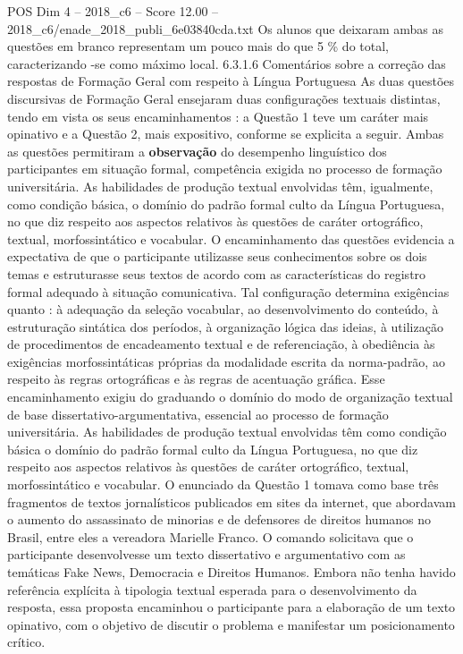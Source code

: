 \begin{textsample}{POS Dim 4 – 2018\_c6 – Score 12.00 – 2018\_c6/enade\_2018\_publi\_6e03840cda.txt}
Os alunos que deixaram ambas as questões em branco representam um pouco mais do que 5 \% do total, caracterizando -se como máximo local. 6.3.1.6 Comentários sobre a correção das respostas de Formação Geral com respeito à Língua Portuguesa As duas questões discursivas de Formação Geral ensejaram duas configurações textuais distintas, tendo em vista os seus encaminhamentos : a Questão 1 teve um caráter mais opinativo e a Questão 2, mais expositivo, conforme se explicita a seguir.
Ambas as questões permitiram a \textbf{observação} do desempenho linguístico dos participantes em situação formal, competência exigida no processo de formação universitária.
As habilidades de produção textual envolvidas têm, igualmente, como condição básica, o domínio do padrão formal culto da Língua Portuguesa, no que diz respeito aos aspectos relativos às questões de caráter ortográfico, textual, morfossintático e vocabular.
O encaminhamento das questões evidencia a expectativa de que o participante utilizasse seus conhecimentos sobre os dois temas e estruturasse seus textos de acordo com as características do registro formal adequado à situação comunicativa.
Tal configuração determina exigências quanto : à adequação da seleção vocabular, ao desenvolvimento do conteúdo, à estruturação sintática dos períodos, à organização lógica das ideias, à utilização de procedimentos de encadeamento textual e de referenciação, à obediência às exigências morfossintáticas próprias da modalidade escrita da norma-padrão, ao respeito às regras ortográficas e às regras de acentuação gráfica.
Esse encaminhamento exigiu do graduando o domínio do modo de organização textual de base dissertativo-argumentativa, essencial ao processo de formação universitária.
As habilidades de produção textual envolvidas têm como condição básica o domínio do padrão formal culto da Língua Portuguesa, no que diz respeito aos aspectos relativos às questões de caráter ortográfico, textual, morfossintático e vocabular.
O enunciado da Questão 1 tomava como base três fragmentos de textos jornalísticos publicados em sites da internet, que abordavam o aumento do assassinato de minorias e de defensores de direitos humanos no Brasil, entre eles a vereadora Marielle Franco.
O comando solicitava que o participante desenvolvesse um texto dissertativo e argumentativo com as temáticas Fake News, Democracia e Direitos Humanos.
Embora não tenha havido referência explícita à tipologia textual esperada para o desenvolvimento da resposta, essa proposta encaminhou o participante para a elaboração de um texto opinativo, com o objetivo de discutir o problema e manifestar um posicionamento crítico.

\end{textsample}
